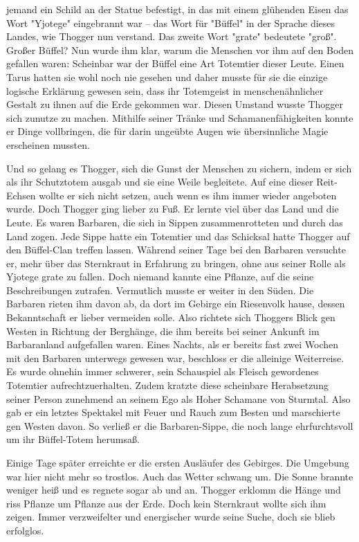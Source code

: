 \documentclass[10pt, a4paper, oneside]{book}
\begin{document}
\begin{multicols}{2}
jemand ein Schild an der Statue befestigt, in das mit einem glühenden Eisen das Wort "Yjotege" eingebrannt war – das Wort für "Büffel" in der Sprache dieses Landes, wie Thogger nun verstand. Das zweite Wort "grate" bedeutete "groß". Großer Büffel? Nun wurde ihm klar, warum die Menschen vor ihm auf den Boden gefallen waren: Scheinbar war der Büffel eine Art Totemtier dieser Leute. Einen Tarus hatten sie wohl noch nie gesehen und daher musste für sie die einzige logische Erklärung gewesen sein, dass ihr Totemgeist in menschenähnlicher Gestalt zu ihnen auf die Erde gekommen war. Diesen Umstand wusste Thogger sich zunutze zu machen. Mithilfe seiner Tränke und Schamanenfähigkeiten konnte er Dinge vollbringen, die für darin ungeübte Augen wie übersinnliche Magie erscheinen mussten. \bigskip


Und so gelang es Thogger, sich die Gunst der Menschen zu sichern, indem er sich als ihr Schutztotem ausgab und sie eine Weile begleitete. Auf eine dieser Reit-Echsen wollte er sich nicht setzen, auch wenn es ihm immer wieder angeboten wurde. Doch Thogger ging lieber zu Fuß. Er lernte viel über das Land und die Leute. Es waren Barbaren, die sich in Sippen zusammenrotteten und durch das Land zogen. Jede Sippe hatte ein Totemtier und das Schicksal hatte Thogger auf den Büffel-Clan treffen lassen. Während seiner Tage bei den Barbaren versuchte er, mehr über das Sternkraut in Erfahrung zu bringen, ohne aus seiner Rolle als Yjotege grate zu fallen. Doch niemand kannte eine Pflanze, auf die seine Beschreibungen zutrafen. Vermutlich musste er weiter in den Süden. Die Barbaren rieten ihm davon ab, da dort im Gebirge ein Riesenvolk hause, dessen Bekanntschaft er lieber vermeiden solle. Also richtete sich Thoggers Blick gen Westen in Richtung der Berghänge, die ihm bereits bei seiner Ankunft im Barbaranland aufgefallen waren. Eines Nachts, als er bereits fast zwei Wochen mit den Barbaren unterwegs gewesen war, beschloss er die alleinige Weiterreise. Es wurde ohnehin immer schwerer, sein Schauspiel als Fleisch gewordenes Totemtier aufrechtzuerhalten. Zudem kratzte diese scheinbare Herabsetzung seiner Person zunehmend an seinem Ego als Hoher Schamane von Sturmtal. Also gab er ein letztes Spektakel mit Feuer und Rauch zum Besten und marschierte gen Westen davon. So verließ er die Barbaren-Sippe, die noch lange ehrfurchtsvoll um ihr Büffel-Totem herumsaß.\bigskip

Einige Tage später erreichte er die ersten Ausläufer des Gebirges. Die Umgebung war hier nicht mehr so trostlos. Auch das Wetter schwang um. Die Sonne brannte weniger heiß und es regnete sogar ab und an. Thogger erklomm die Hänge und riss Pflanze um Pflanze aus der Erde. Doch kein Sternkraut wollte sich ihm zeigen. Immer verzweifelter und energischer wurde seine Suche, doch sie blieb erfolglos.





\end{multicols}
\end{document}
